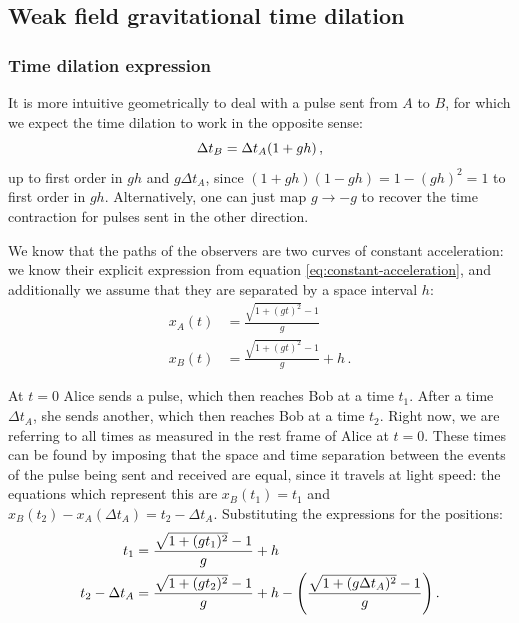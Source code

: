 \documentclass[main.tex]{subfiles}
\begin{document}
\subsection{Weak field gravitational time dilation}

\subsubsection{Time dilation expression}

It is more intuitive geometrically to deal with a pulse sent from \(A\) to \(B\), for which we expect the time dilation to work in the opposite sense: 
%
\begin{equation}
  \Delta t_B = \Delta t_A \qty(1 + gh)
\,,
\end{equation}
%
up to first order in \(gh\) and \(g\Delta t_A\), since \((1+gh )(1-gh) = 1-(gh)^2 = 1\) to first order in \(gh\).
Alternatively, one can just map \(g \rightarrow -g\) to recover the time contraction for pulses sent in the other direction.

We know that the paths of the observers are two curves of constant acceleration: we know their explicit expression from equation \eqref{eq:constant-acceleration}, and additionally we assume that they are separated by a space interval \(h\): 
%
\begin{subequations}
\begin{align}
  x_A(t) &= \frac{\sqrt{1 + (gt)^2} -1}{g} \\ 
  x_B(t) &= \frac{\sqrt{1 + (gt)^2} -1}{g} + h
  \,.
\end{align}
\end{subequations}

At \(t=0\) Alice sends a pulse, which then reaches Bob at a time \(t_1\). After a time \(\Delta t_A\), she sends another, which then reaches Bob at a time \(t_2 \). 
Right now, we are referring to all times as measured in the rest frame of Alice at \(t=0\).
These times can be found by imposing that the space and time separation between the events of the pulse being sent and received are equal, since it travels at light speed: the equations which represent this are \(x_B(t_1) = t_1\) and \(x_B(t_2 ) -x_A (\Delta t_A) = t_2 - \Delta t_A\). Substituting the expressions for the positions:
%
\begin{subequations}
\begin{align}
  t_1 &= \frac{\sqrt{1+(g t_1 )^2} -1}{g} +h \\
  t_2 - \Delta t_A &= \frac{\sqrt{1+(gt_2 )^2} -1}{g} + h - \qty(\frac{\sqrt{1+(g \Delta t_A )^2} -1}{g})\,.
\end{align}
\end{subequations}
\end{document}
